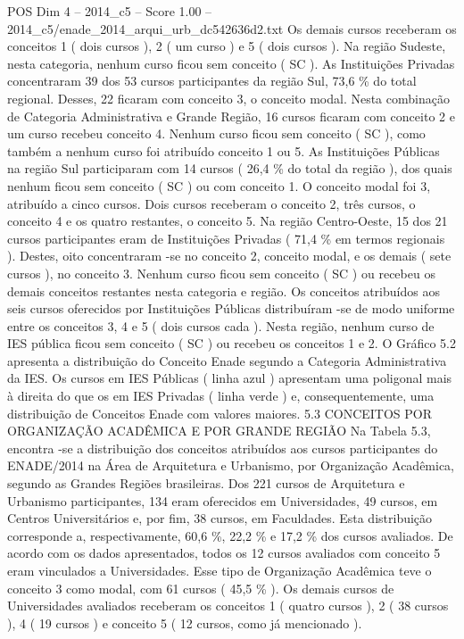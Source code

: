 \begin{textsample}{POS Dim 4 – 2014\_c5 – Score 1.00 – 2014\_c5/enade\_2014\_arqui\_urb\_dc542636d2.txt}
Os demais cursos receberam os conceitos 1 ( dois cursos ), 2 ( um curso ) e 5 ( dois cursos ).
Na região Sudeste, nesta categoria, nenhum curso ficou sem conceito ( SC ).
As Instituições Privadas concentraram 39 dos 53 cursos participantes da região Sul, 73,6 \% do total regional.
Desses, 22 ficaram com conceito 3, o conceito modal.
Nesta combinação de Categoria Administrativa e Grande Região, 16 cursos ficaram com conceito 2 e um curso recebeu conceito 4.
Nenhum curso ficou sem conceito ( SC ), como também a nenhum curso foi atribuído conceito 1 ou 5.
As Instituições Públicas na região Sul participaram com 14 cursos ( 26,4 \% do total da região ), dos quais nenhum ficou sem conceito ( SC ) ou com conceito 1.
O conceito modal foi 3, atribuído a cinco cursos.
Dois cursos receberam o conceito 2, três cursos, o conceito 4 e os quatro restantes, o conceito 5.
Na região Centro-Oeste, 15 dos 21 cursos participantes eram de Instituições Privadas ( 71,4 \% em termos regionais ).
Destes, oito concentraram -se no conceito 2, conceito modal, e os demais ( sete cursos ), no conceito 3.
Nenhum curso ficou sem conceito ( SC ) ou recebeu os demais conceitos restantes nesta categoria e região.
Os conceitos atribuídos aos seis cursos oferecidos por Instituições Públicas distribuíram -se de modo uniforme entre os conceitos 3, 4 e 5 ( dois cursos cada ).
Nesta região, nenhum curso de IES pública ficou sem conceito ( SC ) ou recebeu os conceitos 1 e 2.
O Gráfico 5.2 apresenta a distribuição do Conceito Enade segundo a Categoria Administrativa da IES.
Os cursos em IES Públicas ( linha azul ) apresentam uma poligonal mais à direita do que os em IES Privadas ( linha verde ) e, consequentemente, uma distribuição de Conceitos Enade com valores maiores. 5.3 CONCEITOS POR ORGANIZAÇÃO ACADÊMICA E POR GRANDE REGIÃO Na Tabela 5.3, encontra -se a distribuição dos conceitos atribuídos aos cursos participantes do ENADE/2014 na Área de Arquitetura e Urbanismo, por Organização Acadêmica, segundo as Grandes Regiões brasileiras.
Dos 221 cursos de Arquitetura e Urbanismo participantes, 134 eram oferecidos em Universidades, 49 cursos, em Centros Universitários e, por fim, 38 cursos, em Faculdades.
Esta distribuição corresponde a, respectivamente, 60,6 \%, 22,2 \% e 17,2 \% dos cursos avaliados.
De acordo com os dados apresentados, todos os 12 cursos avaliados com conceito 5 eram vinculados a Universidades.
Esse tipo de Organização Acadêmica teve o conceito 3 como modal, com 61 cursos ( 45,5 \% ).
Os demais cursos de Universidades avaliados receberam os conceitos 1 ( quatro cursos ), 2 ( 38 cursos ), 4 ( 19 cursos ) e conceito 5 ( 12 cursos, como já mencionado ).

\end{textsample}
